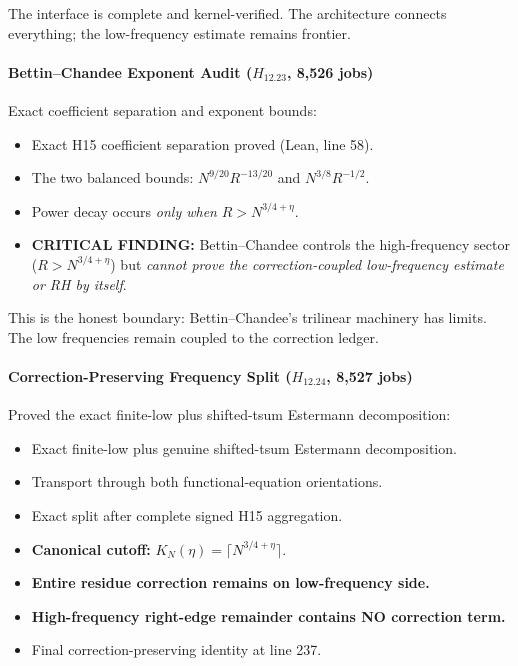 \documentclass[11pt,a4paper]{article}
\theoremstyle{plain}
\theoremstyle{definition}
\theoremstyle{remark}
\begin{document}
The interface is complete and kernel-verified. The architecture connects everything; the low-frequency estimate remains frontier.

\paragraph{Bettin--Chandee Exponent Audit ($H_{12.23}$, 8,526 jobs)}

Exact coefficient separation and exponent bounds:
\begin{itemize}[leftmargin=2em]
  \item Exact H15 coefficient separation proved (Lean, line 58).
  \item The two balanced bounds: $N^{9/20}R^{-13/20}$ and $N^{3/8}R^{-1/2}$.
  \item Power decay occurs \emph{only when} $R > N^{3/4+\eta}$.
  \item \textbf{CRITICAL FINDING:} Bettin--Chandee controls the high-frequency sector ($R > N^{3/4+\eta}$) but \emph{cannot prove the correction-coupled low-frequency estimate or RH by itself}.
\end{itemize}

This is the honest boundary: Bettin--Chandee's trilinear machinery has limits. The low frequencies remain coupled to the correction ledger.

\paragraph{Correction-Preserving Frequency Split ($H_{12.24}$, 8,527 jobs)}

Proved the exact finite-low plus shifted-tsum Estermann decomposition:
\begin{itemize}[leftmargin=2em]
  \item Exact finite-low plus genuine shifted-tsum Estermann decomposition.
  \item Transport through both functional-equation orientations.
  \item Exact split after complete signed H15 aggregation.
  \item \textbf{Canonical cutoff:} $K_N(\eta) = \lceil N^{3/4+\eta} \rceil$.
  \item \textbf{Entire residue correction remains on low-frequency side.}
  \item \textbf{High-frequency right-edge remainder contains NO correction term.}
  \item Final correction-preserving identity at line 237.
\end{itemize}
\end{document}
